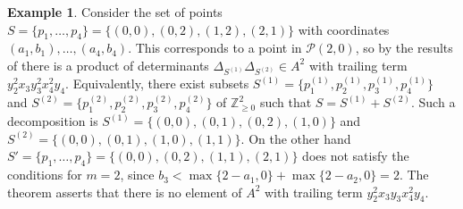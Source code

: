 \documentclass[12pt]{amsart}
\newcommand{\Z}{\mathbb{Z}}
\numberwithin{equation}{section}
\theoremstyle{definition}
\newtheorem{example}[theorem]{Example}
\begin{document}
\begin{example}\label{ex:c2pointdecomp}
    Consider the set of points $S = \{p_1,\dots,p_4\} = \{(0,0),(0,2),(1,2),(2,1)\}$ with coordinates $(a_1,b_1),\dots,(a_4,b_4)$. This corresponds to a point in $\mathcal{P}(2,0)$, so by the results of \cite{C} there is a product of determinants $\Delta_{S^{(1)}}\Delta_{S^{(2)}}\in A^2$ with trailing term $y_2^2 x_3 y_3^2 x_4^2 y_4$. Equivalently, there exist subsets $S^{(1)} = \{ p^{(1)}_1,p^{(1)}_2,p^{(1)}_3,p^{(1)}_4\}$ and $S^{(2)} = \{ p^{(2)}_1,p^{(2)}_2,p^{(2)}_3,p^{(2)}_4\}$ of $\Z^2_{\geq 0}$ such that $S = S^{(1)}+S^{(2)}$. Such a decomposition is $S^{(1)} = \{ (0,0),(0,1),(0,2),(1,0)\}$ and $S^{(2)} = \{ (0,0),(0,1),(1,0),(1,1) \}$. On the other hand $S' = \{p_1,\dots,p_4\} = \{(0,0),(0,2),(1,1),(2,1)\}$ does not satisfy the conditions for $m=2$, since $b_3 < \max\{2-a_1,0\}+\max\{2-a_2,0\} = 2$. The theorem asserts that there is no element of $A^2$ with trailing term $y_2^2 x_3 y_3 x_4^2 y_4$.
    

\end{example}
\end{document}
